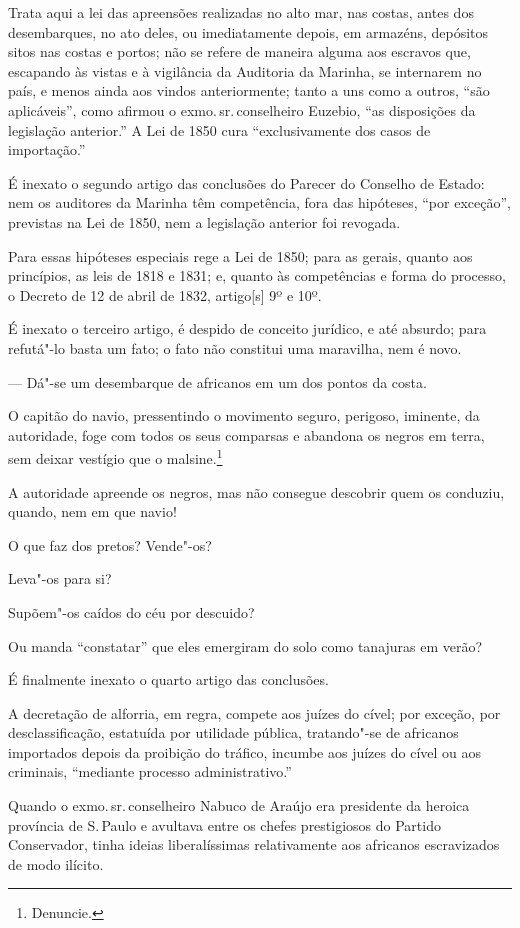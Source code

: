 Trata aqui a lei das apreensões realizadas no alto mar, nas costas,
antes dos desembarques, no ato deles, ou imediatamente depois, em
armazéns, depósitos sitos nas costas e portos; não se refere de maneira
alguma aos escravos que, escapando às vistas e à vigilância da Auditoria
da Marinha, se internarem no país, e menos ainda aos vindos
anteriormente; tanto a uns como a outros, ``são aplicáveis'', como afirmou
o exmo.\,sr.\,conselheiro Euzebio, ``as disposições da legislação
anterior.'' A Lei de 1850 cura ``exclusivamente dos casos de importação.''

É inexato o segundo artigo das conclusões do Parecer do Conselho de
Estado: nem os auditores da Marinha têm competência, fora das hipóteses,
``por exceção'', previstas na Lei de 1850, nem a legislação anterior foi
revogada.

Para essas hipóteses especiais rege a Lei de 1850; para as gerais,
quanto aos princípios, as leis de 1818 e 1831; e, quanto às competências
e forma do processo, o Decreto de 12 de abril de 1832, artigo{[}s{]} 9º
e 10º.

É inexato o terceiro artigo, é despido de conceito jurídico, e até
absurdo; para refutá"-lo basta um fato; o fato não constitui uma
maravilha, nem é novo.

--- Dá"-se um desembarque de africanos em um dos pontos da costa.

O capitão do navio, pressentindo o movimento seguro, perigoso, iminente,
da autoridade, foge com todos os seus comparsas e abandona os negros em
terra, sem deixar vestígio que o malsine.\footnote{Denuncie.}

A autoridade apreende os negros, mas não consegue descobrir quem os
conduziu, quando, nem em que navio!

O que faz dos pretos? Vende"-os?

Leva"-os para si?

Supõem"-os caídos do céu por descuido?

Ou manda ``constatar'' que eles emergiram do solo como tanajuras em verão?

É finalmente inexato o quarto artigo das conclusões.

A decretação de alforria, em regra, compete aos juízes do cível; por
exceção, por desclassificação, estatuída por utilidade pública,
tratando"-se de africanos importados depois da proibição do tráfico,
incumbe aos juízes do cível ou aos criminais, ``mediante processo
administrativo.''

Quando o exmo.\,sr.\,conselheiro Nabuco de Araújo era presidente da
heroica província de S.\,Paulo e avultava entre os chefes prestigiosos do
Partido Conservador, tinha ideias liberalíssimas relativamente aos
africanos escravizados de modo ilícito.

